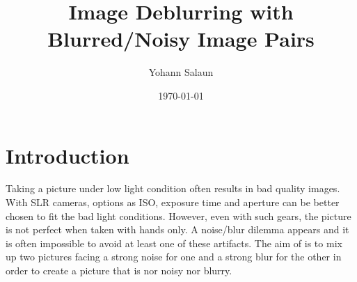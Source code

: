 \documentclass{article}
\title{Image Deblurring with Blurred/Noisy Image Pairs}
\author{Yohann Salaun}
\date{\today}
\begin{document}
\maketitle

\section*{Introduction}

Taking a picture under low light condition often results in bad quality images. With SLR cameras, options as ISO, exposure time and aperture can be better chosen to fit the bad light conditions. However, even with such gears, the picture is not perfect when taken with hands only. A noise/blur dilemma appears and it is often impossible to avoid at least one of these artifacts. The aim of \cite{deblur_denoise} is to mix up two pictures facing a strong noise for one and a strong blur for the other in order to create a picture that is nor noisy nor blurry.
\end{document}
